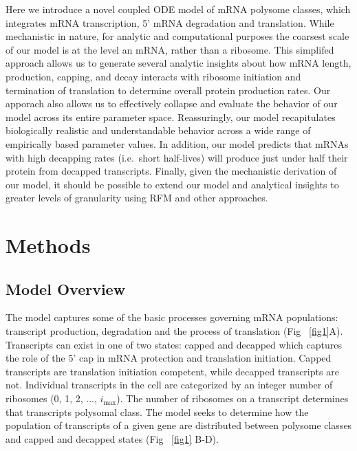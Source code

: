 \documentclass[10pt,letterpaper]{article}
\newcommand{\imax}{\ensuremath{{i_{\max}}}\xspace}
\begin{document}
Here we introduce a novel coupled ODE model of mRNA polysome classes, which integrates mRNA transcription, 5' mRNA degradation and translation.
While mechanistic in nature, for analytic and computational purposes the coarsest scale of our model is at the level an mRNA, rather than a ribosome.
This simplifed approach allows us to generate several analytic insights about how mRNA length, production, capping, and decay interacts with  ribosome initiation and termination of translation to determine overall protein production rates.
Our apporach also allows us to effectively collapse and evaluate the behavior of our model across its entire parameter space.
Reassuringly, our model recapitulates biologically realistic and understandable behavior across a wide range of empirically based parameter values.
In addition, our model predicts that mRNAs with high decapping rates (i.e.~short half-lives) will produce just under half their protein from decapped transcripts.
Finally, given the mechanistic derivation of our model, it should be possible to extend our model and analytical insights to greater levels of granularity using RFM and other approaches.

\section*{Methods}\label{sec:description}
\subsection*{Model Overview}

The model captures some of the basic processes governing mRNA populations: transcript production, degradation and the process of translation (Fig ~\ref{fig1}A).
Transcripts can exist in one of two states: capped and decapped which captures the role of the 5' cap in mRNA protection and translation initiation. 
Capped transcripts are translation initiation competent, while decapped transcripts are not.
Individual transcripts in the cell are categorized by an integer number of ribosomes (0, 1, 2, ..., \imax).
The number of ribosomes on a transcript determines that transcripts polysomal class.
The model seeks to determine how the population of transcripts of a given gene are distributed between polysome classes and capped and decapped states (Fig ~\ref{fig1} B-D).
\end{document}
